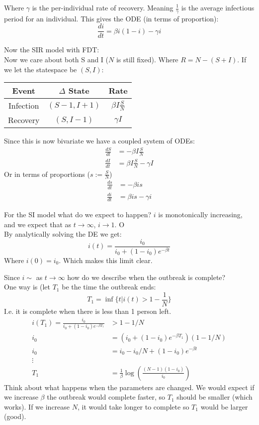 \documentclass{X:/Documents/Coding/Latex/myassignment}
\begin{document}
Where $\gamma$ is the per-individual rate of recovery. Meaning
$\frac1\gamma$ is the average infectious period for an individual.
This gives the ODE (in terms of proportion):
\[\frac{di}{dt} = \beta i(1-i) - \gamma i\]

Now the SIR model with FDT:\\
Now we care about both S and I ($N$ is still fixed). Where $R = N - (S+I)$.
If we let the statespace be $(S,I)$:
\begin{table}[h]
    \centering
    \begin{tabular}{c|c|c}
         Event&$\Delta$ State&Rate \\
         \hline
         Infection&$(S-1,I+1)$&$\beta I\frac{S}{N}$\\
         Recovery &$(S,I-1)$&$\gamma I$
    \end{tabular}
\end{table}

Since this is now bivariate we have a coupled system of ODEs:
\begin{align*}
    \frac{dS}{dt}&=-\beta I\frac{S}{N}\\
    \frac{dI}{dt}&= \beta I \frac{S}{N} - \gamma I
\end{align*}
Or in terms of proportions ($s:=\frac{S}{N}$)
\begin{align*}
    \frac{ds}{dt}&=-\beta is\\
    \frac{di}{dt}&=\beta is - \gamma i
\end{align*}

For the SI model what do we expect to happen?
$i$ is monotonically increasing, and we expect that as $t\to\infty$, $i\to 1$.
O\\
By analytically solving the DE we get:
\[i(t) = \frac{i_0}{i_0 + (1-i_0)e^{-\beta t}}\]
Where $i(0) =i_0$. Which makes this limit clear.

Since $i \sim $ as $t\to \infty$ how do we describe when the outbreak is complete?\\
One way is (let $T_1$ be the time the outbreak ends:
\[T_1 = \inf\{t | i(t) > 1-\frac{1}{N}\}\]
I.e. it is complete when there is less than 1 person left.
\begin{align*}
    i(T_1) = \frac{i_0}{i_0+(1-i_0)e^{-\beta T_1}} & > 1-1/N\\
    i_0 &= (i_0+(1-i_0)e^{-\beta T_1})(1-1/N)\\
    i_0&=i_0 - i_0/N + (1-i_0)e^{-\beta t}\\
    \vdots\\
    T_1&= \frac{1}{\beta} \log\left(\frac{(N-1)(1-i_0)}{i_0}\right)
\end{align*}
Think about what happens when the parameters are changed.
We would expect if we increase $\beta$ the outbreak would complete faster, so $T_1$ should be smaller (which works). If we increase $N$, it would take longer to complete so $T_1$ would be larger (good).
\end{document}
